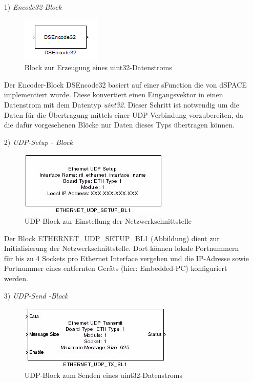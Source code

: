 \documentclass[fontsize = 12pt, paper = a4]{scrreprt}
\begin{document}
\begin{itemize}

\item[1)] \textit{Encode32-Block}

\begin{figure}[h]
\centering
\includegraphics[scale = 1]{dsencode32}
\caption{Block zur Erzeugung eines uint32-Datenstroms}
\label{DSEncode32-Block}
\end{figure} 

Der Encoder-Block DSEncode32 basiert auf einer sFunction die von dSPACE implementiert wurde. Diese konvertiert einen Eingangsvektor in einen Datenstrom mit dem Datentyp \textit{uint32}. Dieser Schritt ist notwendig um die Daten für die Übertragung mittels einer UDP-Verbindung vorzubereiten, da die dafür vorgesehenen Blöcke nur Daten dieses Typs übertragen können. 

\item[2)] \textit{UDP-Setup - Block} 

\begin{figure}[h]
\centering
\includegraphics[scale = 1]{ethernet_udp_setup_block}
\caption{UDP-Block zur Einstellung der Netzwerkschnittstelle}
\end{figure}

Der Block ETHERNET\_UDP\_SETUP\_BL1 (\*Abbildung\*) dient zur Initialisierung der Netzwerkschnittstelle. Dort können lokale Portnummern für bis zu 4 Sockets pro Ethernet Interface vergeben und die IP-Adresse sowie Portnummer eines entfernten Geräts (hier: Embedded-PC) konfiguriert werden.

\item[3)] \textit{UDP-Send -Block}

\begin{figure}[h]
\centering
\includegraphics[scale = 1]{ethernet_udp_send_block.png}
\caption{UDP-Block zum Senden eines uint32-Datenstroms}
\end{figure}


\end{itemize}
\end{document}
